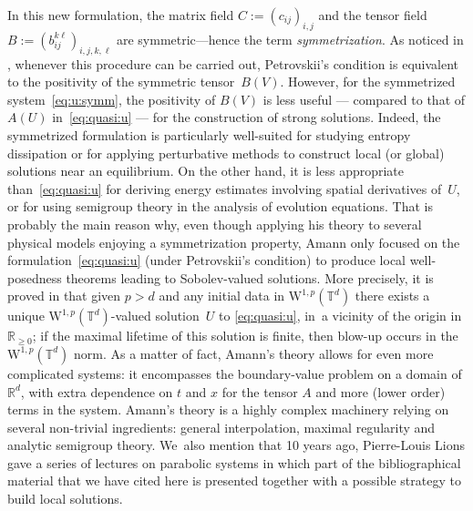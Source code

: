 \documentclass[10pt]{amsart}
\theoremstyle{definition}
\newcommand\R{\mathbb{R}}
\newcommand\T{\mathbb{T}}
\newcommand\W{\mathrm{W}}
\begin{document}
{In this new formulation, the matrix field $C:= (c_{ij})_{i,j}$ and the tensor field $B:=(b_{ij}^{k\ell})_{i,j,k,\ell}$ are symmetric---hence the term \emph{symmetrization}. As noticed in \cite{gio}, whenever this procedure can be carried out, Petrovskii's condition is equivalent to the positivity of the symmetric tensor~$B(V)$. However, for the symmetrized system~\eqref{eq:u:symm}, the positivity of $B(V)$ is less useful --- compared to that of $A(U)$ in~\eqref{eq:quasi:u} --- for the construction of strong solutions. Indeed, the symmetrized formulation is particularly well-suited for studying entropy dissipation or for applying perturbative methods to construct local (or global) solutions near an equilibrium. On the other hand, it is less appropriate than~\eqref{eq:quasi:u} for deriving energy estimates involving spatial derivatives of~$U$, or for using semigroup theory in the analysis of evolution equations. That is probably the main reason why, even though applying his theory to several physical models enjoying a symmetrization property, Amann only focused on the formulation~\eqref{eq:quasi:u} (under Petrovskii's condition) to produce local well-posedness theorems leading to Sobolev-valued solutions.} More precisely, it is proved in \cite{amann} that given $p>d$ and any initial data in $\W^{1,p}(\T^d)$ there exists a unique $\W^{1,p}(\T^d)$-valued solution~$U$ to \eqref{eq:quasi:u}, in~a vicinity of the origin in $\R_{\geq 0}$; if the maximal lifetime of this solution is finite, then blow-up occurs in the $\W^{1,p}(\T^d)$ norm. As a matter of fact, Amann's theory allows for even more complicated systems: it encompasses the boundary-value problem on a domain of $\R^d$, with extra dependence on $t$ and $x$ for the tensor $A$ and more (lower order) terms in the system. Amann's theory is a highly complex machinery relying on several non-trivial ingredients: general interpolation, maximal regularity and analytic semigroup theory. We~also mention that 10 years ago, Pierre-Louis Lions gave a series of lectures on parabolic systems \cite{pilou} in which part of the bibliographical material that we have cited here is presented together with a possible strategy to build local solutions.
\end{document}
